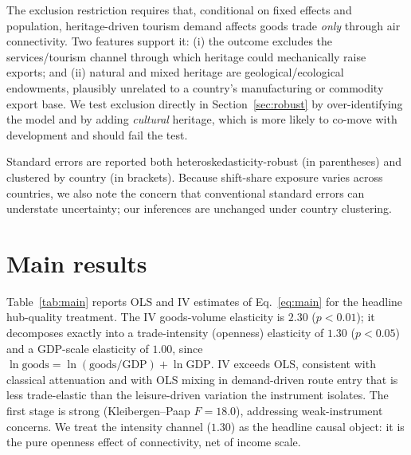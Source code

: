 \documentclass[review,3p,times]{elsarticle}
\begin{document}
The exclusion restriction requires that, conditional on fixed effects and
population, heritage-driven tourism demand affects goods trade \emph{only}
through air connectivity. Two features support it: (i) the outcome excludes the
services/tourism channel through which heritage could mechanically raise
exports; and (ii) natural and mixed heritage are geological/ecological
endowments, plausibly unrelated to a country's manufacturing or commodity
export base. We test exclusion directly in Section~\ref{sec:robust} by
over-identifying the model and by adding \emph{cultural} heritage, which is more
likely to co-move with development and should fail the test.

Standard errors are reported both heteroskedasticity-robust (in parentheses)
and clustered by country (in brackets). Because shift-share exposure varies
across countries, we also note the \citet{Adao_2019} concern that conventional
standard errors can understate uncertainty; our inferences are unchanged under
country clustering.

\section{Main results}
Table~\ref{tab:main} reports OLS and IV estimates of Eq.~\eqref{eq:main} for
the headline hub-quality treatment. The IV goods-volume elasticity is $2.30$
($p<0.01$); it decomposes exactly into a trade-intensity (openness) elasticity
of $1.30$ ($p<0.05$) and a GDP-scale elasticity of $1.00$, since
$\ln\text{goods} = \ln(\text{goods}/\text{GDP}) + \ln\text{GDP}$. IV exceeds
OLS, consistent with classical attenuation and with OLS mixing in
demand-driven route entry that is less trade-elastic than the leisure-driven
variation the instrument isolates. The first stage is strong
(Kleibergen--Paap $F=18.0$), addressing weak-instrument concerns. We treat the
intensity channel ($1.30$) as the headline causal object: it is the pure
openness effect of connectivity, net of income scale.
\end{document}
